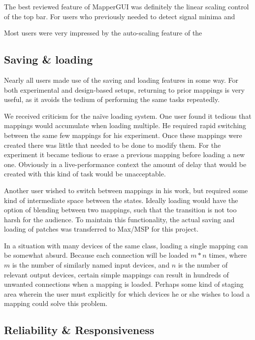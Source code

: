 The best reviewed feature of MapperGUI was definitely the linear scaling control of the top bar. For users who previously needed to detect signal minima and

Most users were very impressed by the auto-scaling feature of the
	

	\subsection{Saving \& loading} %
	\label{sub:saving_and_loading}

Nearly all users made use of the saving and loading features in some way. For both experimental and design-based setups, returning to prior mappings is very useful, as it avoids the tedium of performing the same tasks repeatedly.

We received criticism for the na\"ive loading system. One user found it tedious that mappings would accumulate when loading multiple. He required rapid switching between the same few mappings for his experiment. Once these mappings were created there was little that needed to be done to modify them. For the experiment it became tedious to erase a previous mapping before loading a new one. Obviously in a live-performance context the amount of delay that would be created with this kind of task would be unacceptable. 

Another user wished to switch between mappings in his work, but required some kind of intermediate space between the states. Ideally loading would have the option of blending between two mappings, such that the transition is not too harsh for the audience. To maintain this functionality, the actual saving and loading of patches was transferred to Max/MSP for this project.

In a situation with many devices of the same class, loading a single mapping can be somewhat absurd. Because each connection will be loaded $m*n$ times, where $m$ is the number of similarly named input devices, and $n$ is the number of relevant output devices, certain simple mappings can result in hundreds of unwanted connections when a mapping is loaded. Perhaps some kind of staging area wherein the user must explicitly for which devices he or she wishes to load a mapping could solve this problem.
	

	\subsection{Reliability \& Responsiveness} %
	\label{sub:reliability_and_responsiveness}

